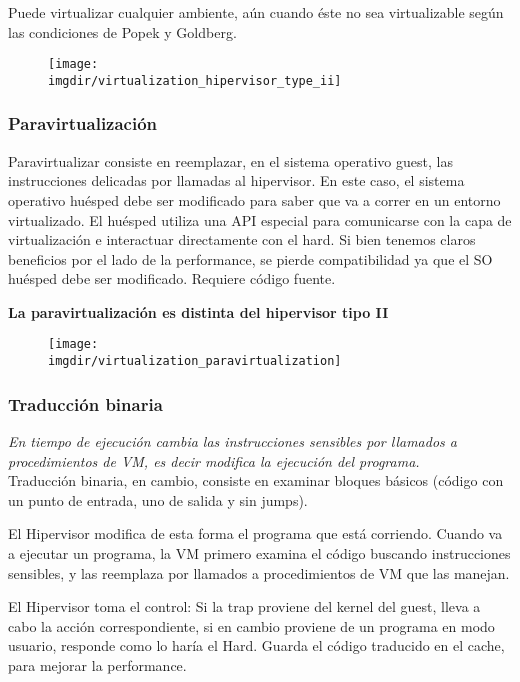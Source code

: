 \documentclass[a4paper, twoside]{article}
\newcommand{\imgdir}{../resources/images} %
\begin{document}
Puede virtualizar cualquier ambiente, aún cuando éste no sea virtualizable según las condiciones de Popek y Goldberg.

\begin{figure}[H]
	\centering
	\texttt{[image: \\imgdir/virtualization\_hipervisor\_type\_ii]}
	\label{fig:virtualizacion_hipervisor_tipo_ii}
\end{figure}

\subsubsection{Paravirtualización}
Paravirtualizar consiste en reemplazar, en el sistema operativo guest, las instrucciones delicadas por llamadas al hipervisor. En este caso, el sistema operativo huésped debe ser modificado para saber que va a correr en un entorno virtualizado. El huésped utiliza una API especial para comunicarse con la capa de virtualización e interactuar directamente con el hard. Si bien tenemos claros beneficios por el lado de la performance, se pierde compatibilidad ya que el SO huésped debe ser modificado. Requiere código fuente.

\textbf{La paravirtualización es distinta del hipervisor tipo II}

\begin{figure}[H]
	\centering
	\texttt{[image: \\imgdir/virtualization\_paravirtualization]}
	\label{fig:virtualizacion_paravirtualization}
\end{figure}

\subsubsection{Traducción binaria}
\textit{En tiempo de ejecución cambia las instrucciones sensibles por llamados a procedimientos de VM, es decir modifica la ejecución del programa.}\\

Traducción binaria, en cambio, consiste en examinar bloques básicos (código con un punto de entrada, uno de salida y sin jumps).

El Hipervisor modifica de esta forma el programa que está corriendo. Cuando va a ejecutar un programa, la VM primero examina el código buscando instrucciones sensibles, y las reemplaza por llamados a procedimientos de VM que las manejan.

El Hipervisor toma el control: Si la trap proviene del kernel del guest, lleva a cabo la acción correspondiente, si en cambio proviene de un programa en modo usuario, responde como lo haría el Hard.
Guarda el código traducido en el cache, para mejorar la performance.
\end{document}
